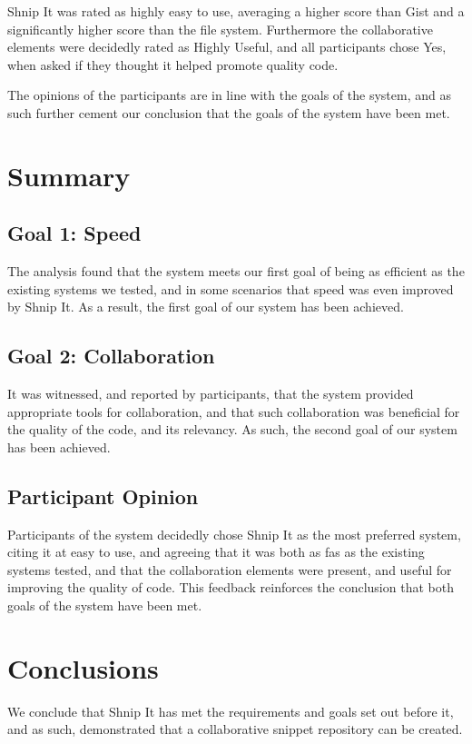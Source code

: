 Shnip It was rated as highly easy to use, averaging a higher score than Gist and a significantly higher score than the file system.
Furthermore the collaborative elements were decidedly rated as Highly Useful, and all participants chose Yes, when asked if they thought it helped promote quality code.

The opinions of the participants are in line with the goals of the system, and as such further cement our conclusion that the goals of the system have been met.

\section{Summary} \label{conclusionsummary}
\subsection{Goal 1: Speed}
The analysis found that the system meets our first goal of being as efficient as the existing systems we tested, and in some scenarios that speed was even improved by Shnip It. 
As a result, the first goal of our system has been achieved.

\subsection{Goal 2: Collaboration}
It was witnessed, and reported by participants, that the system provided appropriate tools for collaboration, and that such collaboration was beneficial for the quality of the code, and its relevancy.
As such, the second goal of our system has been achieved.

\subsection{Participant Opinion}
Participants of the system decidedly chose Shnip It as the most preferred system, citing it at easy to use, and agreeing that it was both as fas as the existing systems tested, and that the collaboration elements were present, and useful for improving the quality of code.
This feedback reinforces the conclusion that both goals of the system have been met.

\section{Conclusions}
We conclude that Shnip It has met the requirements and goals set out before it, and as such, demonstrated that a collaborative snippet repository can be created.

